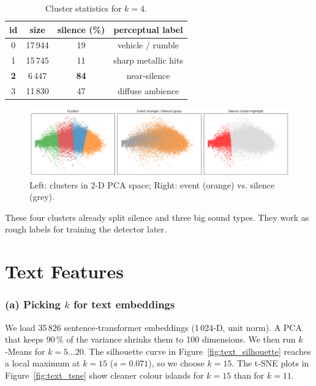 \documentclass[runningheads]{llncs}
\begin{document}
\begin{table}[h]
    \caption{Cluster statistics for $k=4$.}
    \label{tab:cluster}
    \centering
    \begin{tabular}{cccc}
        \toprule
        id & size & silence (\%) & perceptual label \\ \midrule
        0 & 17\,944 & 19 & vehicle / rumble \\
        1 & 15\,745 & 11 & sharp metallic hits \\
        \textbf{2} & 6\,447 & \textbf{84} & near‑silence \\
        3 & 11\,830 & 47 & diffuse ambience \\ \bottomrule
    \end{tabular}
\end{table}

\begin{figure}[h]
    \centering
    \includegraphics[width=.45\linewidth]{figs_tang/03_pca_clusters.png}
    \caption{Left: clusters in 2‑D PCA space; Right: event (orange) vs. silence (grey).}
    \label{fig:pca_scatter}
\end{figure}

These four clusters already split silence and three big sound types. They work as rough labels for training the detector later.



\section{Text Features}

\subsubsection{(a) Picking $k$ for text embeddings}
We load 35\,826 sentence‑transformer embeddings (1\,024‑D, unit norm). A PCA that keeps 90\,\% of the variance shrinks them to 100 dimensions. We then run $k$‑Means for $k=5\ldots20$. The silhouette curve in Figure~\ref{fig:text_silhouette} reaches a local maximum at $k=15$ ($s=0.071$), so we choose \textbf{$k=15$}. The t‑SNE plots in Figure~\ref{fig:text_tsne} show cleaner colour islands for $k=15$ than for $k=11$.
\end{document}
